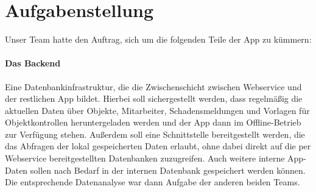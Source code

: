 \documentclass[12pt]{article}
\begin{document}
\begin{abstract}
Im Folgenden geht es um die Implementierung einer Hausmeister-App, von uns FacilityManager getauft, mit der Schadensmeldungen verfasst und abgeschickt, Objektkontrollen anhand von Checklisten durchgeführt und dokumentiert und Informationen über Objekte abgerufen werden können.
\paragraph{Fachlicher Aspekt}
Zu dieser App existierte anfangs bereits ein Prototyp, neu ist allerdings die Zusammenführung aller Funktionen in einer Anwendung und die Möglichkeit, Objektkontrollen mithilfe der App durchzuführen. Außerdem war vorgegeben, dass die neue Auflage der Hausmeister-App auch offline funktioniert, was durch eine interne Wrapper-Datenbank für die per RESTful-Webservice erreichbare bereits vorhandene Datenbank realisiert werden sollte. Mehr dazu in Abschnitt \ref{sec:aufg}.
\paragraph{Technologie}
Damit die App auf möglichst vielen Plattformen läuft, haben wir uns am Anfang des Projekts für die Umsetzung mit dem Ionic-Framework entschieden. Dieses ermöglichte uns ein Arbeiten auf hohem Abstraktionsniveau bei gleichzeitigem Handhaben der Implementierung auf Android, iOS, als Web-App, Electron-App, etc.
\paragraph{Organisation}
Zu Beginn wurde das Projekt auf drei Arbeitsteams aufgeteilt, ein Team für das Backend, ein Team für den Schadensmeldungsteil der GUI und ein Team für den Objektkontrollenteil der GUI. Hier soll es um den Beitrag des ersten dieser Teams gehen.
\end{abstract}

\section{Aufgabenstellung}\label{sec:aufg} 
Unser Team hatte den Auftrag, sich um die folgenden Teile der App zu kümmern:
\paragraph{Das Backend} Eine Datenbankinfrastruktur, die die Zwischenschicht zwischen Webservice und der restlichen App bildet. Hierbei soll sichergestellt werden, dass regelmäßig die aktuellen Daten über Objekte, Mitarbeiter, Schadensmeldungen und Vorlagen für Objektkontrollen heruntergeladen werden und der App dann im Offline-Betrieb zur Verfügung stehen. Außerdem soll eine Schnittstelle bereitgestellt werden, die das Abfragen der lokal gespeicherten Daten erlaubt, ohne dabei direkt auf die per Webservice bereitgestellten Datenbanken zuzugreifen. Auch weitere interne App-Daten sollen nach Bedarf in der internen Datenbank gespeichert werden können. Die entsprechende Datenanalyse war dann Aufgabe der anderen beiden Teams.
\end{document}
